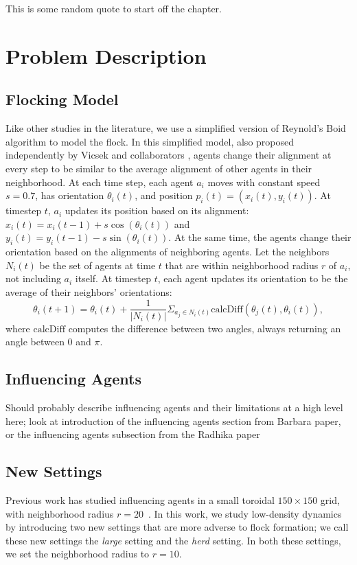 \begin{savequote}[75mm]
This is some random quote to start off the chapter.
\end{savequote}

\chapter{Problem Description}

\section{Flocking Model}
Like other studies in the literature, we use a simplified version of Reynold's
Boid algorithm \cite{reynoldsmodel} to model the flock.
In this simplified model, also proposed independently by Vicsek and
collaborators \cite{vicsek1995},
agents change their alignment at every step to be similar to the average
alignment of other agents in their neighborhood.
At each time step, each agent $a_i$ moves with constant speed $s=0.7$, has
orientation $\theta_i(t)$, and position $p_i(t) = (x_i(t), y_i(t))$.
At timestep $t$, $a_i$ updates its position based on its alignment:
$x_i(t) = x_i(t-1) + s\cos(\theta_i(t))$ and
$y_i(t) = y_i (t-1) - s\sin(\theta_i(t))$.
At the same time, the agents change their orientation based on the alignments
of neighboring agents.
Let the neighbors $N_i(t)$ be the set of agents at time $t$ that are within
neighborhood radius $r$ of $a_i$, not including $a_i$ itself.
At timestep $t$, each agent updates its orientation to be the average of their
neighbors' orientations:
\[\theta_i(t+1)=\theta_i(t)+\frac{1}{|N_i(t)|} \Sigma_{a_j \in N_i(t)}
\text{calcDiff}(\theta_j(t),\theta_i(t)),\]
where $\text{calcDiff}$ computes the difference between two angles, always
returning an angle between $0$ and $\pi$.

\section{Influencing Agents}
Should probably describe influencing agents and their limitations at a high
level here; look at introduction of the influencing agents section from Barbara
paper, or the influencing agents subsection from the Radhika paper

\section{New Settings}
Previous work has studied influencing agents in a small toroidal $150\times150$
grid, with neighborhood radius $r=20$~\cite{genter2016facegoalfacecurrent,
genter201612steplookahead}.
In this work, we study low-density dynamics by introducing two new settings
that are more adverse to flock formation; we call these new settings the
\textit{large} setting and the \textit{herd} setting.
In both these settings, we set the neighborhood radius to $r=10$.

